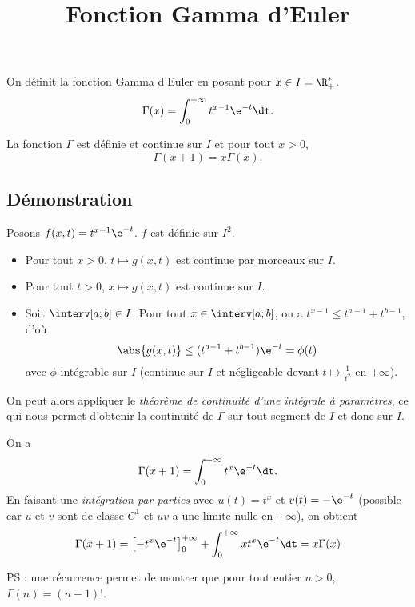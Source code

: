 \documentclass[fontsize=12pt,twoside=false,parskip=half]{scrartcl}
\title{Fonction Gamma d’Euler}
\date{}
\author{}
\begin{document}
\maketitle
    On définit la fonction Gamma d’Euler en posant pour $x \in I = \R_+^*$.
    \[
      \Gamma(x) = \int_0^{+\infty} t^{x - 1} \e^{-t} \dt.
    \]
   \begin{Theoreme}
      La fonction $\Gamma$ est définie et continue sur $I$ et pour tout $x > 0$,
      \[
         \Gamma(x + 1) = x\Gamma(x).
      \]
   \end{Theoreme}
   \subsection{Démonstration}
      Posons $f(x, t) = t^{x - 1} \e^{-t}$. $f$ est définie sur $I^2$.
      \begin{itemize}
         \item Pour tout $x > 0$, $t \mapsto g(x,  t)$ est continue par morceaux sur $I$.
         \item Pour tout $t > 0$, $x \mapsto g(x,  t)$ est continue sur $I$.
         \item Soit $\interv[a; b] \in I$. Pour tout $x \in \interv[a; b]$, on a $t^{x - 1} \leq t^{a - 1} + t^{b - 1}$, d’où
            \[
               \abs{g(x, t)} \leq (t^{a - 1} + t^{b - 1})\e^{-t} = \phi(t)
            \]
            avec $\phi$ intégrable sur $I$ (continue sur $I$ et négligeable devant $t \mapsto \frac{1}{t^2}$ en $+\infty$). 
      \end{itemize}
      On peut alors appliquer le \emph{théorème de continuité d’une intégrale à paramètres}, ce qui nous permet d’obtenir la continuité de $\Gamma$ sur tout segment de $I$
      et donc sur $I$.
      
      On a 
      \[
         \Gamma(x + 1) = \int_0^{+\infty} t^{x} \e^{-t} \dt.
      \]
      En faisant une \emph{intégration par parties} avec $u(t) = t^x$ et $v(t) = -\e^{-t}$ (possible car $u$ et $v$ sont de classe $C^1$ et $uv$ a une limite nulle en $+\infty$), on obtient
      \[
         \Gamma(x + 1) = \left[-t^x\e^{-t}\right]_0^{+\infty} + \int_0^{+\infty} xt^{x} \e^{-t} \dt = x\Gamma(x)
      \]
      
      PS : une récurrence permet de montrer que pour tout entier $n > 0$, $\Gamma(n) = (n - 1)!$.
\end{document}
